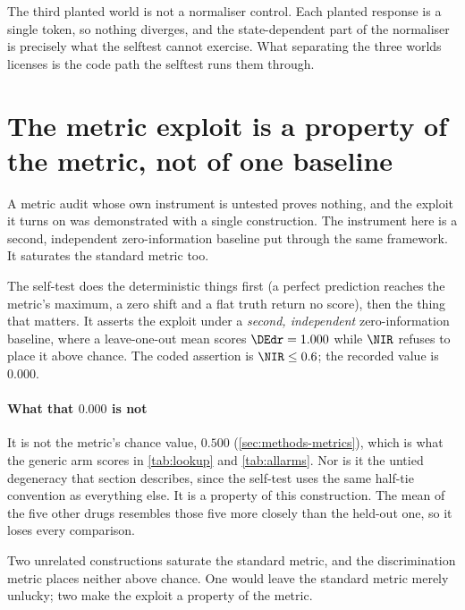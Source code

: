 \begin{scopelimit}
The third planted world is not a normaliser control. Each planted response is a
single token, so nothing diverges, and the state-dependent part of the
normaliser is precisely what the selftest cannot exercise. What separating the
three worlds licenses is the code path the selftest runs them through.
\end{scopelimit}

\section{The metric exploit is a property of the metric, not of one baseline}
\label{sec:app-selftest}

\begin{question}
A metric audit whose own instrument is untested proves nothing, and the exploit
it turns on was demonstrated with a single construction. The instrument here is
a second, independent zero-information baseline put through the same framework.
It saturates the standard metric too.
\end{question}

\noindent
The self-test does the deterministic things first (a perfect prediction reaches
the metric's maximum, a zero shift and a flat truth return no score), then the
thing that matters. It asserts the exploit under a \emph{second, independent}
zero-information baseline, where a leave-one-out mean scores $\DEdr = 1.000$
while $\NIR$ refuses to place it above chance. The coded assertion is
$\NIR \leq 0.6$; the recorded value is $0.000$.

\paragraph{What that $0.000$ is not} It is not the metric's chance value,
$0.500$ (\cref{sec:methods-metrics}), which is what the generic arm scores in
\cref{tab:lookup} and \cref{tab:allarms}. Nor is it the untied degeneracy that
section describes, since the self-test uses the same half-tie convention as
everything else. It is a property of this construction. The mean of the five
other drugs resembles those five more closely than the held-out one, so it loses
every comparison.

Two unrelated constructions saturate the standard metric, and the discrimination
metric places neither above chance. One would leave the standard metric merely
unlucky; two make the exploit a property of the metric.
